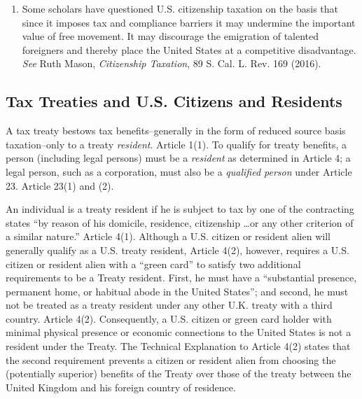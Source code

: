\begin{enumerate}
	\item
	Some scholars have questioned U.S. citizenship taxation on the basis that since it imposes tax and compliance barriers it may undermine the important value of free movement.  It may discourage the emigration of talented foreigners and thereby place the United States at a competitive disadvantage.  \textit{See} Ruth Mason, \textit{Citizenship Taxation}, 89 S. Cal. L. Rev. 169  (2016).  
\end{enumerate}

\subsection{Tax Treaties and U.S. Citizens and Residents}

A tax treaty bestows tax benefits--generally in the form of reduced source basis taxation--only to a treaty \emph{resident}. Article 1(1).  To qualify for treaty benefits, a person (including legal persons) must be a \emph{resident} as determined in Article 4; a legal person, such as a corporation, must also be a \emph{qualified person} under Article 23.  Article 23(1) and (2).   

An individual is a treaty resident if he is subject to tax by one of the contracting states ``by reason of his domicile, residence, citizenship \ldots or any other criterion of a similar nature.''  Article 4(1).  Although a U.S. citizen or resident alien will generally qualify as a U.S. treaty resident, Article 4(2), however, requires a U.S. citizen or resident alien with a ``green card'' to satisfy two additional requirements to be a Treaty resident.  First, he must have a ``substantial presence, permanent home, or habitual abode in the United States''; and second, he must not be treated as a treaty resident under any other U.K. treaty with a third country.  Article 4(2).  Consequently, a U.S. citizen or green card holder with minimal physical presence or economic connections to the United States is not a resident under the Treaty.  The Technical Explanation to Article 4(2) states that the second requirement prevents a citizen or resident alien from choosing the (potentially superior) benefits of the Treaty over those of the treaty between the United Kingdom and his foreign country of residence.  

